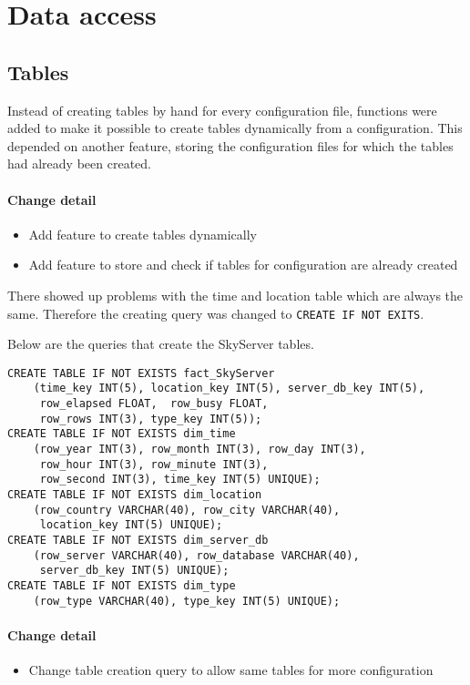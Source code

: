 \section{Data access}

\subsection{Tables}

Instead of creating tables by hand for every configuration file, functions
were added to make it possible to create tables dynamically from
a configuration. This depended on another feature,
storing the configuration files for which the tables had already been created.

\paragraph{Change detail}
\begin{itemize}
  \item Add feature to create tables dynamically
  \item Add feature to store and check if tables for configuration are already created
\end{itemize}

There showed up problems with the time and location table
which are always the same. Therefore the creating query
was changed to \texttt{CREATE IF NOT EXITS}.

Below are the queries that create the SkyServer tables.
\begin{lstlisting}
CREATE TABLE IF NOT EXISTS fact_SkyServer 
	(time_key INT(5), location_key INT(5), server_db_key INT(5),
	 row_elapsed FLOAT,  row_busy FLOAT,
	 row_rows INT(3), type_key INT(5));
CREATE TABLE IF NOT EXISTS dim_time 
	(row_year INT(3), row_month INT(3), row_day INT(3),
	 row_hour INT(3), row_minute INT(3),
	 row_second INT(3), time_key INT(5) UNIQUE);
CREATE TABLE IF NOT EXISTS dim_location 
	(row_country VARCHAR(40), row_city VARCHAR(40),
	 location_key INT(5) UNIQUE);
CREATE TABLE IF NOT EXISTS dim_server_db 
	(row_server VARCHAR(40), row_database VARCHAR(40),
	 server_db_key INT(5) UNIQUE);
CREATE TABLE IF NOT EXISTS dim_type 
	(row_type VARCHAR(40), type_key INT(5) UNIQUE);
\end{lstlisting}


\paragraph{Change detail}
\begin{itemize}
  \item Change table creation query to allow same tables for more configuration
\end{itemize}

